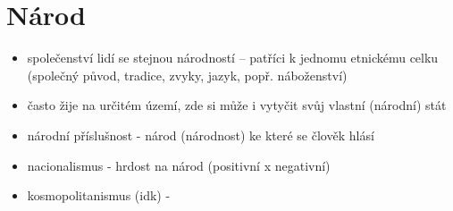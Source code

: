 \documentclass{article}
\begin{document}
\section{Národ}
\begin{itemize}
  \item společenství lidí se stejnou národností -- patříci k jednomu etnickému celku (společný původ, tradice, zvyky, jazyk, popř. náboženství)
  \item často žije na určitém území, zde si může i vytyčit svůj vlastní (národní) stát
  \item národní příslušnost - národ (národnost) ke které se člověk hlásí
  \item nacionalismus - hrdost na národ (positivní x negativní)
  \item kosmopolitanismus (idk) - 
\end{itemize}
\end{document}
